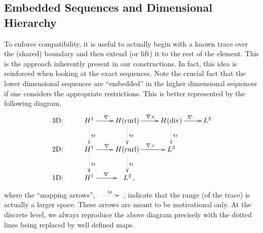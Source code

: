 \subsection{Embedded Sequences and Dimensional Hierarchy}
\label{sec:dimensionalhierarchy}

To enforce compatibility, it is useful to actually begin with a known trace over the (shared) boundary and then extend (or lift) it to the rest of the element.
This is the approach inherently present in our constructions.
In fact, this idea is reinforced when looking at the exact sequences.
Note the crucial fact that the lower dimensional sequences are ``embedded'' in the higher dimensional sequences if one considers the appropriate restrictions.
This is better represented by the following diagram,
\begin{equation}
	\begin{gathered}
  	\xymatrix{
        {\text{3D:}} & H^1 \ar[r]^{\nabla\,\,\,\,} \ar@{.>}[d]^{\mathrm{tr}} & H(\mathrm{curl})
          \ar[r]^{\,\,\,\nabla\times} \ar@{.>}[d]^{\mathrm{tr}} & H(\mathrm{div})
          	\ar[r]^{\,\,\,\nabla\cdot} \ar@{.>}[d]^{\mathrm{tr}} & L^2\\
        {\text{2D:}} & H^1 \ar[r]^{\nabla\,\,\,} \ar@{.>}[d]^{\mathrm{tr}} & H(\mathrm{curl})
          \ar[r]^{\,\,\,\nabla\times} \ar@{.>}[d]^{\mathrm{tr}} & L^2\\
        {\text{1D:}} & H^1 \ar[r]^{\nabla\,\,\,\,} & \,\,\,\,L^2\,,\, }
	\end{gathered}\label{eq:traceexactsequences}
\end{equation}
where the ``mapping arrows'', $\xymatrix{{}\ar@{.>}[r]^{\mathrm{tr}}&{}}$, indicate that the range (of the trace) is actually a larger space.
These arrows are meant to be motivational only.
At the discrete level, we always reproduce the above diagram precisely with the dotted lines being replaced by well defined maps.

